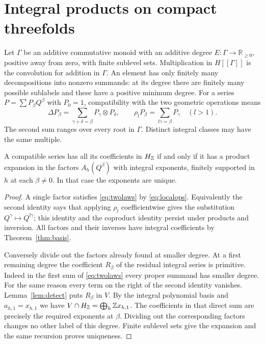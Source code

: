 \section{Integral products on compact threefolds}\label{sec:compact}

Let $\Gamma$ be an additive commutative monoid with an additive degree
$E:\Gamma\to\mathbb R_{\ge0}$, positive away from zero, with finite
sublevel sets. Multiplication in $H[[\Gamma]]$ is the convolution for
addition in $\Gamma$. An element has only finitely many decompositions
into nonzero summands: at its degree there are finitely many possible
sublabels and these have a positive minimum degree. For a series
$P=\sum P_\beta Q^\beta$ with $P_0=1$, compatibility with the
two geometric operations means
\begin{equation}\label{eq:twolaws}
 \Delta P_\beta=\sum_{\gamma+\delta=\beta}P_\gamma\otimes P_\delta,
 \qquad
 \rho_l P_\beta=\sum_{l\gamma=\beta}P_\gamma\quad(l>1).
\end{equation}
The second sum ranges over every root in $\Gamma$. Distinct integral
classes may have the same multiple.

\begin{proposition}\label{prop:criterion}
A compatible series has all its coefficients in $H_{\mathbb Z}$ if and only if it has
a product expansion in the factors $A_h(Q^\beta)$ with integral
exponents, finitely supported in $h$ at each $\beta\ne0$. In that case
the exponents are unique.
\end{proposition}
\begin{proof}
A single factor satisfies \eqref{eq:twolaws} by \eqref{eq:localops}.
Equivalently the second identity says that applying $\rho_l$
coefficientwise gives the substitution $Q^\gamma\mapsto Q^{l\gamma}$;
this identity and the coproduct identity persist under products and
inversion. All factors and their inverses have integral coefficients
by Theorem~\ref{thm:basis}.

Conversely divide out the factors already found at smaller degree.
At a first remaining degree the coefficient $R_\beta$ of the residual
integral series is primitive. Indeed in the first sum of
\eqref{eq:twolaws} every proper summand has smaller degree. For the
same reason every term on the right of the second identity vanishes.
Lemma~\ref{lem:detect} puts $R_\beta$ in $V$. By the integral
polynomial basis and $a_{h,1}=x_{h,1}$ we have
$V\cap H_{\mathbb Z}=\bigoplus_h\mathbb Z x_{h,1}$. The coefficients in that direct
sum are precisely the required exponents at $\beta$. Dividing out the
corresponding factors changes no other label of this degree.
Finite sublevel sets give the expansion and the same recursion proves
uniqueness.
\end{proof}

